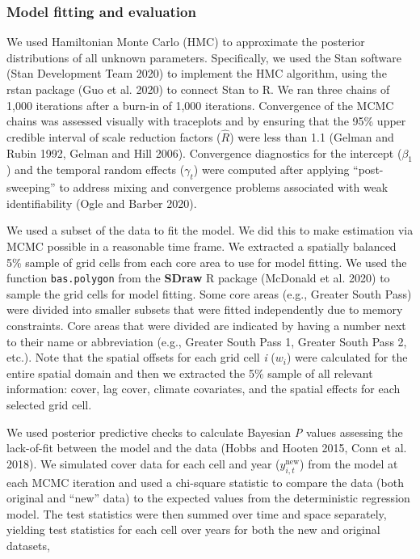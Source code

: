 \documentclass[
  12pt,
]{article}
\begin{document}
\hypertarget{model-fitting-and-evaluation}{%
\subsubsection{Model fitting and evaluation}\label{model-fitting-and-evaluation}}

We used Hamiltonian Monte Carlo (HMC) to approximate the posterior distributions of all unknown parameters.
Specifically, we used the Stan software (Stan Development Team 2020) to implement the HMC algorithm, using the rstan package (Guo et al. 2020) to connect Stan to R.
We ran three chains of 1,000 iterations after a burn-in of 1,000 iterations.
Convergence of the MCMC chains was assessed visually with traceplots and by ensuring that the 95\% upper credible interval of scale reduction factors (\(\hat{R}\)) were less than 1.1 (Gelman and Rubin 1992, Gelman and Hill 2006).
Convergence diagnostics for the intercept (\(\beta_1\)) and the temporal random effects (\(\gamma_t\)) were computed after applying ``post-sweeping'' to address mixing and convergence problems associated with weak identifiability (Ogle and Barber 2020).

We used a subset of the data to fit the model.
We did this to make estimation via MCMC possible in a reasonable time frame.
We extracted a spatially balanced 5\% sample of grid cells from each core area to use for model fitting.
We used the function \texttt{bas.polygon} from the \textbf{SDraw} R package (McDonald et al. 2020) to sample the grid cells for model fitting.
Some core areas (e.g., Greater South Pass) were divided into smaller subsets that were fitted independently due to memory constraints.
Core areas that were divided are indicated by having a number next to their name or abbreviation (e.g., Greater South Pass 1, Greater South Pass 2, etc.).
Note that the spatial offsets for each grid cell \emph{i} (\(w_i\)) were calculated for the entire spatial domain and then we extracted the 5\% sample of all relevant information: cover, lag cover, climate covariates, and the spatial effects for each selected grid cell.

We used posterior predictive checks to calculate Bayesian \emph{P} values assessing the lack-of-fit between the model and the data (Hobbs and Hooten 2015, Conn et al. 2018).
We simulated cover data for each cell and year (\(y^{\text{new}}_{i,t}\)) from the model at each MCMC iteration and used a chi-square statistic to compare the data (both original and ``new'' data) to the expected values from the deterministic regression model.
The test statistics were then summed over time and space separately, yielding test statistics for each cell over years for both the new and original datasets,
\end{document}
